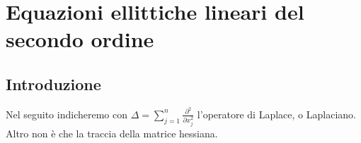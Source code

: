 

\chapter{Equazioni ellittiche lineari del secondo ordine}\label{Equazioni ellittiche lineari del secondo ordine}
\section{Introduzione}
Nel seguito indicheremo con $\Delta = \sum_{j=1}^{n}\frac{\partial^2}{\partial x_j^2}$ l'operatore di Laplace, o Laplaciano. Altro non è che la traccia della matrice hessiana.

